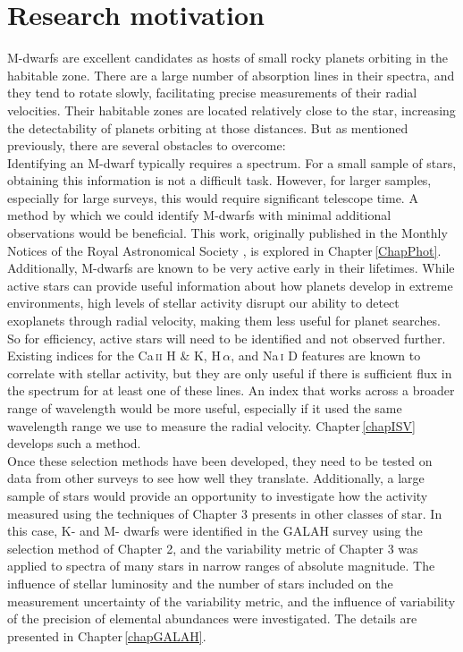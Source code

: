 \section{Research motivation}
M-dwarfs are excellent candidates as hosts of small rocky planets orbiting in the habitable zone. There are a large number of absorption lines in their spectra, and they tend to rotate slowly, facilitating precise measurements of their radial velocities. Their habitable zones are located relatively close to the star, increasing the detectability of planets orbiting at those distances. But as mentioned previously, there are several obstacles to overcome:\\

Identifying an M-dwarf typically requires a spectrum. For a small sample of stars, obtaining this information is not a difficult task. However, for larger samples, especially for large surveys, this would require significant telescope time. A method by which we could identify M-dwarfs with minimal additional observations would be beneficial. This work, originally published in the Monthly Notices of the Royal Astronomical Society \citep{2019Bentley}, is explored in Chapter\,\ref{ChapPhot}.\\

Additionally, M-dwarfs are known to be very active early in their lifetimes. While active stars can provide useful information about how planets develop in extreme environments, high levels of stellar activity disrupt our ability to detect exoplanets through radial velocity, making them less useful for planet searches. So for efficiency, active stars will need to be identified and not observed further. Existing indices for the Ca\,\textsc{ii} H \& K, H\,\textsc{$\alpha$}, and Na\,\textsc{i} D features are known to correlate with stellar activity, but they are only useful if there is sufficient flux in the spectrum for at least one of these lines. An index that works across a broader range of wavelength would be more useful, especially if it used the same wavelength range we use to measure the radial velocity. Chapter\,\ref{chapISV} develops such a method.\\

Once these selection methods have been developed, they need to be tested on data from other surveys to see how well they translate. Additionally, a large sample of stars would provide an opportunity to investigate how the activity measured using the techniques of Chapter 3 presents in other classes of star. In this case, K- and M- dwarfs were identified in the GALAH survey using the selection method of Chapter 2, and the variability metric of Chapter 3 was applied to spectra of many stars in narrow ranges of absolute magnitude. The influence of stellar luminosity and the number of stars included on the measurement uncertainty of the variability metric, and the influence of variability of the precision of elemental abundances were investigated. The details are presented in Chapter\,\ref{chapGALAH}.